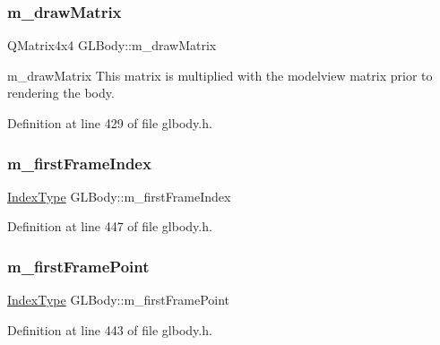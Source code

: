 \subsubsection{\texorpdfstring{m\_drawMatrix}{m\_drawMatrix}}
{\footnotesize\ttfamily Q\+Matrix4x4 G\+L\+Body\+::m\+\_\+draw\+Matrix\hspace{0.3cm}{\ttfamily [protected]}}



m\+\_\+draw\+Matrix This matrix is multiplied with the modelview matrix prior to rendering the body. 



Definition at line 429 of file glbody.\+h.

\mbox{\label{class_g_l_body_a6db51835ac52260561d8f93ce1e55c15}} 
\subsubsection{\texorpdfstring{m\_firstFrameIndex}{m\_firstFrameIndex}}
{\footnotesize\ttfamily \mbox{\hyperlink{gldefines_8h_af3c748960f29c42e5b7f1dc449ab66ff}{Index\+Type}} G\+L\+Body\+::m\+\_\+first\+Frame\+Index\hspace{0.3cm}{\ttfamily [protected]}}



Definition at line 447 of file glbody.\+h.

\mbox{\label{class_g_l_body_a1b14db868b9e81a32a935f6bdaeba118}} 
\subsubsection{\texorpdfstring{m\_firstFramePoint}{m\_firstFramePoint}}
{\footnotesize\ttfamily \mbox{\hyperlink{gldefines_8h_af3c748960f29c42e5b7f1dc449ab66ff}{Index\+Type}} G\+L\+Body\+::m\+\_\+first\+Frame\+Point\hspace{0.3cm}{\ttfamily [protected]}}



Definition at line 443 of file glbody.\+h.

\mbox{\label{class_g_l_body_abd2520f3e746310a122729a26ce32b9f}} 
